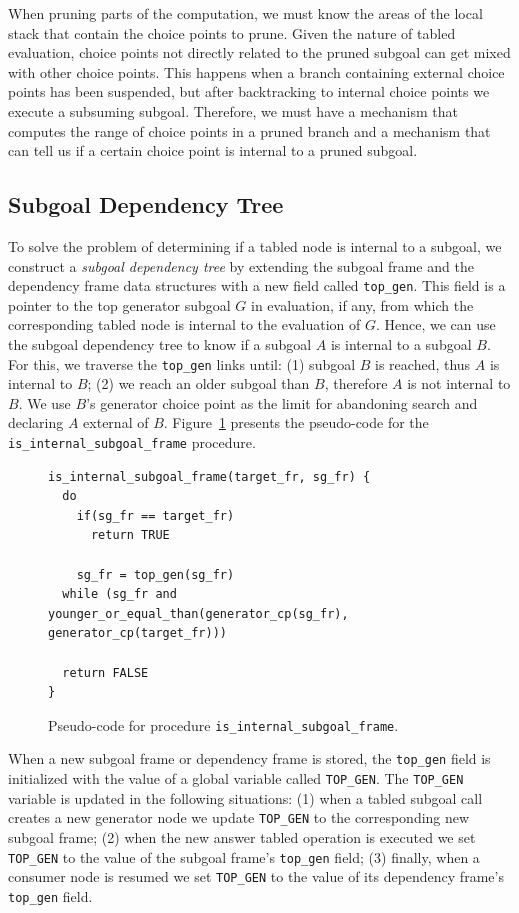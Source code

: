 When pruning parts of the computation, we must know the areas of the local stack
that contain the choice points to prune. Given the nature of tabled evaluation, choice points not
directly related to the pruned subgoal can get mixed with other choice points. This happens when a branch
containing external choice points has been suspended, but after backtracking to internal choice points we
execute a subsuming subgoal. Therefore, we must have a mechanism that computes the range of choice points
in a pruned branch and a mechanism that can tell us if a certain choice point is internal to a pruned subgoal.

\subsection{Subgoal Dependency Tree}

To solve the problem of determining if a tabled node is internal to a subgoal,
we construct a \emph{subgoal dependency tree} by extending the subgoal frame and the
dependency frame data structures with a new field called \texttt{top\_gen}. This field is a pointer to
the top generator subgoal $G$ in evaluation, if any, from which the corresponding tabled node is
internal to the evaluation of $G$.
Hence, we can use the subgoal dependency tree to know if a subgoal $A$ is internal
to a subgoal $B$. For this, we traverse the \texttt{top\_gen} links until:
(1) subgoal $B$ is reached, thus $A$ is internal to $B$; (2) we reach an older subgoal
than $B$, therefore $A$ is not internal to $B$. We use $B$'s generator choice point
as the limit for abandoning search and declaring $A$ external of $B$.
Figure~\ref{fig:is_internal_subgoal_frame} presents the pseudo-code for the
\texttt{is\_internal\_subgoal\_frame} procedure.

\begin{figure}[ht]
\begin{Verbatim}
is_internal_subgoal_frame(target_fr, sg_fr) {
  do
    if(sg_fr == target_fr)
      return TRUE
    
    sg_fr = top_gen(sg_fr)
  while (sg_fr and younger_or_equal_than(generator_cp(sg_fr), generator_cp(target_fr)))
  
  return FALSE
}
\end{Verbatim}
\caption{Pseudo-code for procedure \texttt{is\_internal\_subgoal\_frame}.}
\label{fig:is_internal_subgoal_frame}
\end{figure}

When a new subgoal frame or dependency frame is stored, the \texttt{top\_gen} field is initialized
with the value of a global variable called \texttt{TOP\_GEN}. The \texttt{TOP\_GEN} variable is updated in the following
situations: (1) when a tabled subgoal call creates a new generator node we update
\texttt{TOP\_GEN} to the corresponding new subgoal frame; (2) when the new answer tabled operation
is executed we set \texttt{TOP\_GEN} to the value of the subgoal frame's \texttt{top\_gen}
field; (3) finally, when a consumer node is resumed we set \texttt{TOP\_GEN} to the value
of its dependency frame's \texttt{top\_gen} field.

